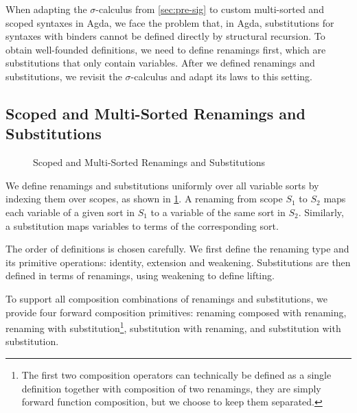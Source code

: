 \documentclass[screen,nonacm]{acmart}
\begin{document}
When adapting the $\sigma$-calculus from \cref{sec:pre-sig} to custom
multi-sorted and scoped syntaxes in Agda, we face the problem that, in Agda,
substitutions for syntaxes with binders cannot be defined directly by
structural recursion. To obtain well-founded definitions, we need to define
renamings first, which are substitutions that only contain variables. After we
defined renamings and substitutions, we revisit the $\sigma$-calculus and adapt
its laws to this setting.

\subsection{Scoped and Multi-Sorted Renamings and Substitutions}\label{sec:mis-sub}
\begin{figure}[t]
      \centering
      \small
      \begin{minipage}[t]{0.48\linewidth}
            \small
            \raggedright{}
            \ERen{}
      \end{minipage}
      \hfill
      \begin{minipage}[t]{0.48\linewidth}
            \small
            \raggedright{}
            \ESub{}
      \end{minipage}
      \caption{Scoped and Multi-Sorted Renamings and Substitutions}
      \label{fig:mis-ras}
\end{figure}

We define renamings and substitutions uniformly over all variable sorts by
indexing them over scopes, as shown in \cref{fig:mis-ras}. A renaming from
scope $S_1$ to $S_2$ maps each variable of a given sort in $S_1$ to a variable
of the same sort in $S_2$. Similarly, a substitution maps variables to terms of
the corresponding sort.

The order of definitions is chosen carefully. We first define the renaming type
and its primitive operations: identity, extension and weakening. Substitutions
are then defined in terms of renamings, using weakening to define lifting.

To support all composition combinations of renamings and substitutions, we
provide four forward composition primitives: renaming composed with renaming,
renaming with substitution\footnote{The first two composition operators can
      technically be defined as a single definition together with composition of two
      renamings, they are simply forward function composition, but we choose to keep
      them separated.}, substitution with renaming, and substitution with
substitution.
\end{document}
